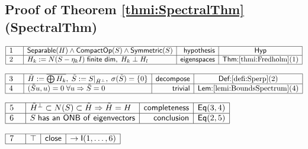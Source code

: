 \documentclass[11pt,reqno]{amsart}
\begin{document}
	\subsection*{Proof of Theorem \protect\ref{thmi:SpectralThm} (\textsf{SpectralThm})}
	\noindent$\begin{array}{|m{0.5cm}|l|r|c|}
	\hline
	1 & \mathsf{Separable}(H)\wedge\mathsf{CompactOp}(S)\wedge\mathsf{Symmetric}(S) & \mathsf{hypothesis} & \mathsf{Hyp} \\ \hline
	2 & H_{k}:=N(S-\eta_{k}I)\;\mathsf{finite\ dim},\;H_{k}\perp H_{l} & \mathsf{eigenspaces} & \textsf{Thm:}\ref{thmi:Fredholm}(1) \\ \hline
	\end{array}$
	\par\nointerlineskip\noindent$\begin{array}{|m{0.5cm}|l|r|c|}
	\hline
	3 & \tilde{H}:=\overline{\bigoplus H_{k}},\;\tilde{S}:=S|_{\tilde{H}^{\perp}},\;\sigma(\tilde{S})=\{0\} & \mathsf{decompose} & \textsf{Def:}\ref{defi:Sperp}(2) \\ \hline
	4 & (\tilde{S}u,u)=0\;\forall u\Rightarrow\tilde{S}=0 & \mathsf{trivial} & \textsf{Lem:}\ref{lemi:BoundsSpectrum}(4) \\ \hline
	\end{array}$
	\par\nointerlineskip\noindent$\begin{array}{|m{0.5cm}|l|r|c|}
	\hline
	5 & \tilde{H}^{\perp}\subset N(S)\subset\tilde{H}\Rightarrow\tilde{H}=H & \mathsf{completeness} & \mathsf{Eq}(3,4) \\ \hline
	6 & S\;\mathsf{has\ an\ ONB\ of\ eigenvectors} & \mathsf{conclusion} & \mathsf{Eq}(2,5) \\ \hline
	\end{array}$
	\par\nointerlineskip\noindent$\begin{array}{|m{0.5cm}|l|r|c|}
	\hline
	7 & \top & \mathsf{close} & \to\mathsf{I}(1,\dots,6) \\ \hline
	\end{array}$
	\medskip
	
\end{document}
